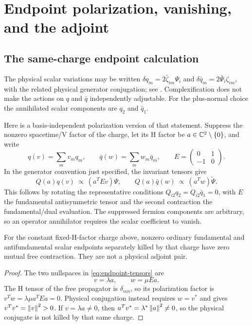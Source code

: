 \section{Endpoint polarization, vanishing, and the adjoint}\label{sec:endpoints}

\subsection{The same-charge endpoint calculation}

The physical scalar variations may be written
$\delta q_m=2\bar\zeta_{im}\Psi_i$ and
$\delta\bar q_m=2\bar\Psi_i\zeta_{im}$, with the related physical
generator conjugation; see \cite[Appendix~C]{Baker}. Complexification
does not make the actions on $q$ and $\bar q$ independently adjustable.
For the plus-normal choice the annihilated scalar components are
$q_2$ and $\bar q_1$.

Here is a basis-independent polarization version of that statement.
Suppress the nonzero spacetime/V factor of the charge, let its H factor
be $a\in\mathbb C^2\setminus\{0\}$, and write
\begin{equation}
 q(v)=\sum_m v_mq_m,\qquad\bar q(w)=\sum_m w_m\bar q_m,
 \qquad E=\begin{pmatrix}0&1\\-1&0\end{pmatrix}.
\end{equation}
In the generator convention just specified, the invariant tensors give
\begin{equation}\label{eq:endpoint-tensors}
 Q(a)q(v)\ \propto\ (a^TEv)\Psi,\qquad
 Q(a)\bar q(w)\ \propto\ (a^Tw)\widetilde\Psi.
\end{equation}
This follows by rotating the representative conditions
$Q_{i2}q_2=Q_{i2}\bar q_1=0$, with $E$ the fundamental antisymmetric
tensor and the second contraction the fundamental/dual evaluation.
The suppressed fermion components are arbitrary, so an operator
annihilator requires the scalar coefficient to vanish.

\begin{proposition}\label{prop:endpoint-zero}
For the constant fixed-H-factor charge above, nonzero ordinary
fundamental and antifundamental scalar endpoints separately killed by
that charge have zero mutual free contraction. They are not a physical
adjoint pair.
\end{proposition}
\begin{proof}
The two nullspaces in \eqref{eq:endpoint-tensors} are
\begin{equation}
 v=\lambda a,\qquad w=\mu Ea.
\end{equation}
The H tensor of the free propagator is $\delta_{mn}$, so its polarization
factor is $v^Tw=\lambda\mu a^TEa=0$.
Physical conjugation instead requires $w=v^*$ and gives
$v^Tv^*=\left\lVert v\right\rVert^2>0$. If $v=\lambda a\ne0$, then
$a^Tv^*=\lambda^*\left\lVert a\right\rVert^2\ne0$, so the physical conjugate is not
killed by that same charge.
\end{proof}

